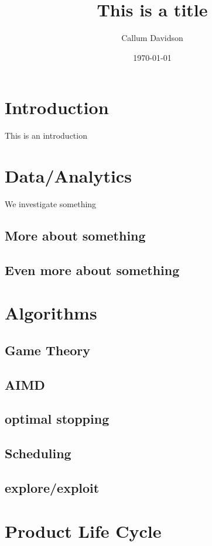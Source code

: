 \documentclass{article}
\title {This is a title}
\author {Callum Davidson}
\date{\today}
\begin{document}
\maketitle
\tableofcontents

\section{Introduction}
This is an introduction
\label{sec:intro}

\section{Data/Analytics}
We investigate something

\subsection{More about something}

\subsection{Even more about something}

\section{Algorithms}
\subsection{Game Theory}
\subsection{AIMD}
\subsection{optimal stopping}
\subsection{Scheduling}
\subsection{explore/exploit}

\section{Product Life Cycle} 
\end{document}
